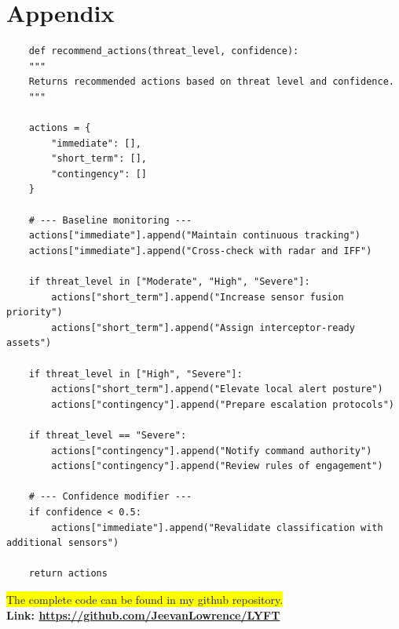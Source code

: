 \documentclass[11pt]{article}
\begin{document}
\appendix
\section{Appendix}

\begin{lstlisting}
    def recommend_actions(threat_level, confidence):
    """
    Returns recommended actions based on threat level and confidence.
    """

    actions = {
        "immediate": [],
        "short_term": [],
        "contingency": []
    }

    # --- Baseline monitoring ---
    actions["immediate"].append("Maintain continuous tracking")
    actions["immediate"].append("Cross-check with radar and IFF")

    if threat_level in ["Moderate", "High", "Severe"]:
        actions["short_term"].append("Increase sensor fusion priority")
        actions["short_term"].append("Assign interceptor-ready assets")

    if threat_level in ["High", "Severe"]:
        actions["short_term"].append("Elevate local alert posture")
        actions["contingency"].append("Prepare escalation protocols")

    if threat_level == "Severe":
        actions["contingency"].append("Notify command authority")
        actions["contingency"].append("Review rules of engagement")

    # --- Confidence modifier ---
    if confidence < 0.5:
        actions["immediate"].append("Revalidate classification with additional sensors")

    return actions

\end{lstlisting}

\colorbox{yellow}{The complete code can be found in my github repository.}\\
\textbf{Link: \url{https://github.com/JeevanLowrence/LYFT}}
\end{document}
